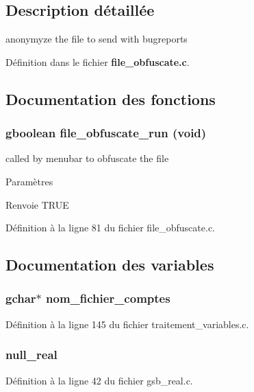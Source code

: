 \subsection{Description détaillée}
anonymyze the file to send with bugreports 

Définition dans le fichier {\bf file\_\-obfuscate.c}.



\subsection{Documentation des fonctions}
\subsubsection[{file\_\-obfuscate\_\-run}]{\setlength{\rightskip}{0pt plus 5cm}gboolean file\_\-obfuscate\_\-run (void)}\label{file__obfuscate_8c_ab4c30cf882f9fd42b304325a0501e3b1}
called by menubar to obfuscate the file


\begin{DoxyParams}{Paramètres}
\item[{\em }]\end{DoxyParams}
\begin{DoxyReturn}{Renvoie}
TRUE 
\end{DoxyReturn}


Définition à la ligne 81 du fichier file\_\-obfuscate.c.



\subsection{Documentation des variables}
\subsubsection[{nom\_\-fichier\_\-comptes}]{\setlength{\rightskip}{0pt plus 5cm}gchar$\ast$ {\bf nom\_\-fichier\_\-comptes}}\label{file__obfuscate_8c_ae00b9af94c75169e6ab8cf0ec25e8b89}


Définition à la ligne 145 du fichier traitement\_\-variables.c.

\subsubsection[{null\_\-real}]{ {\bf null\_\-real}}\label{file__obfuscate_8c_a26f304bec3fdc0651b9aa8765d4de3c6}


Définition à la ligne 42 du fichier gsb\_\-real.c.

